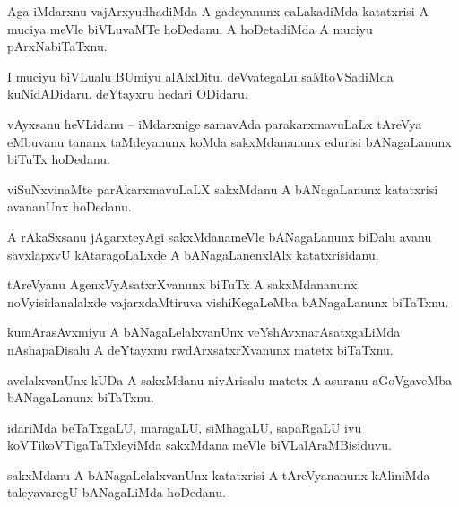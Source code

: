 \documentclass{article}
\begin{document}
\begin{mng}%
Aga iMdarxnu  vajArxyudhadiMda A gadeyanunx  caLakadiMda katatxrisi A muciya meVle biVLuvaMTe 
hoDedanu. A hoDetadiMda A muciyu pArxNabiTaTxnu.
\end{mng}

\begin{mng}%
I muciyu biVLualu BUmiyu alAlxDitu. deVvategaLu saMtoVSadiMda kuNidADidaru. deYtayxru hedari ODidaru.
\end{mng}


\begin{mng}%
vAyxsanu heVLidanu -- iMdarxnige samavAda parakarxmavuLaLx tAreVya eMbuvanu tananx taMdeyanunx 
koMda sakxMdananunx edurisi bANagaLanunx biTuTx hoDedanu.
\end{mng}

\begin{mng}%
viSuNxvinaMte parAkarxmavuLaLX sakxMdanu A bANagaLanunx katatxrisi avananUnx hoDedanu.
\end{mng}

\begin{mng}%
A rAkaSxsanu jAgarxteyAgi sakxMdanameVle bANagaLanunx biDalu avanu savxlapxvU kAtaragoLaLxde A 
bANagaLanenxlAlx katatxrisidanu.
\end{mng}

\begin{mng}%
tAreVyanu AgenxVyAsatxrXvanunx biTuTx A sakxMdananunx noVyisidanalalxde vajarxdaMtiruva 
vishiKegaLeMba bANagaLanunx biTaTxnu.
\end{mng}

\begin{mng}%
kumArasAvxmiyu A bANagaLelalxvanUnx veYshAvxnarAsatxgaLiMda nAshapaDisalu A deYtayxnu 
rwdArxsatxrXvanunx matetx biTaTxnu.
\end{mng}

\begin{mng}%
avelalxvanUnx kUDa A sakxMdanu nivArisalu matetx A asuranu aGoVgaveMba bANagaLanunx biTaTxnu.
\end{mng}

\begin{mng}%
idariMda beTaTxgaLU, maragaLU, siMhagaLU, sapaRgaLU ivu koVTikoVTigaTaTxleyiMda sakxMdana meVle 
biVLalAraMBisiduvu.
\end{mng}

\begin{mng}%
sakxMdanu A bANagaLelalxvanUnx katatxrisi A tAreVyananunx kAliniMda taleyavaregU bANagaLiMda hoDedanu.
\end{mng}
\end{document}
